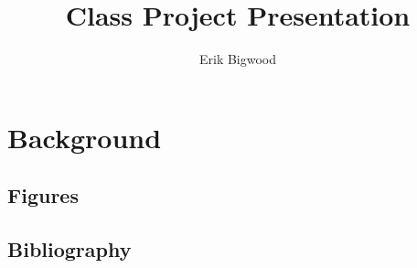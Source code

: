 \documentclass[]{article}
\title{Class Project Presentation}
\author{Erik Bigwood}
\begin{document}
\maketitle

\begin{abstract}

\end{abstract}

\tableofcontents
\newpage

\section{Background}




\newpage
\begin{appendices}
\section{Figures}






\end{appendices}



\newpage
\begin{appendices}
	\section{Bibliography}
	\printbibliography
\end{appendices}
\end{document}
